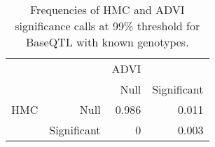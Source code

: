 \begin{table}[ht]
\centering
\caption{Frequencies of HMC and ADVI significance calls at 99\% threshold for BaseQTL with known genotypes.} 
\label{tab:gt-xtab-prop-99}
\begin{tabular}{rr|rr}
   &  & ADVI &  \\ 
    &   & Null & Significant \\ 
   \hline
HMC & Null & 0.986 & 0.011 \\ 
    & Significant & 0 & 0.003 \\ 
  \end{tabular}
\end{table}
